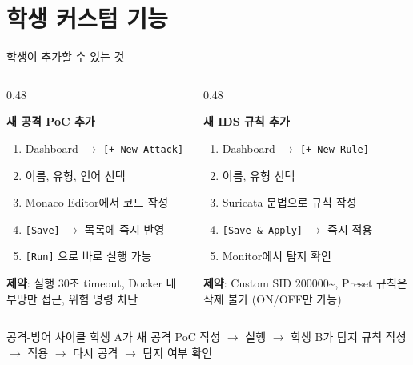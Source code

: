 \documentclass[aspectratio=169,10pt]{beamer}
\newcommand{\red}[1]{\textcolor{redTeam}{\textbf{#1}}}
\newcommand{\blue}[1]{\textcolor{blueTeam}{\textbf{#1}}}
\begin{document}
\section{학생 커스텀 기능}

\begin{frame}{학생이 추가할 수 있는 것}
\begin{columns}[T]
\begin{column}{0.48\textwidth}
\begin{block}{\red{새 공격 PoC 추가}}
\begin{enumerate}
    \item Dashboard $\rightarrow$ \texttt{[+ New Attack]}
    \item 이름, 유형, 언어 선택
    \item Monaco Editor에서 코드 작성
    \item \texttt{[Save]} $\rightarrow$ 목록에 즉시 반영
    \item \texttt{[Run]} 으로 바로 실행 가능
\end{enumerate}
\vspace{0.3em}
{\footnotesize
\textbf{제약}: 실행 30초 timeout, Docker 내부망만 접근, 위험 명령 차단
}
\end{block}
\end{column}
\begin{column}{0.48\textwidth}
\begin{block}{\blue{새 IDS 규칙 추가}}
\begin{enumerate}
    \item Dashboard $\rightarrow$ \texttt{[+ New Rule]}
    \item 이름, 유형 선택
    \item Suricata 문법으로 규칙 작성
    \item \texttt{[Save \& Apply]} $\rightarrow$ 즉시 적용
    \item Monitor에서 탐지 확인
\end{enumerate}
\vspace{0.3em}
{\footnotesize
\textbf{제약}: Custom SID 200000\textasciitilde, Preset 규칙은 삭제 불가 (ON/OFF만 가능)
}
\end{block}
\end{column}
\end{columns}

\vspace{0.5em}
\begin{alertblock}{공격-방어 사이클}
학생 A가 새 공격 PoC 작성 $\rightarrow$ 실행 $\rightarrow$
학생 B가 탐지 규칙 작성 $\rightarrow$ 적용 $\rightarrow$
다시 공격 $\rightarrow$ 탐지 여부 확인
\end{alertblock}
\end{frame}
\end{document}
